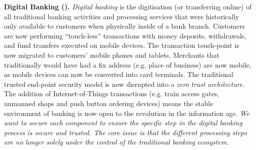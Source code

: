 \begin{Workpackage}{\thewpno}
\begin{Task}

\textbf{Digital Banking (\SOPRAshort{}).} \emph{Digital banking} is the digitisation (or transferring online) of all traditional banking activities and processing services that were historically only available to customers when physically inside of a bank branch. Customers are now performing ``touch-less'' transactions with money deposits, withdrawals, and fund transfers executed on mobile devices. The transaction touch-point is now migrated to customers' mobile phones and tablets. Merchants that traditionally would have had a fix address (e.g. place of business) are now mobile, as  mobile devices can now be converted into card terminals. The traditional trusted end-point security model is now disrupted into a \emph{zero trust architecture}. The addition of Internet-of-Things transactions (e.g. train access gates, unmanned shops and push button ordering devices) means the stable environment of banking is now open to the revolution in the information age. \emph{We want to secure each component to ensure the specific step in the digital banking process is secure and trusted. The core issue is that the different processing steps are no longer solely under the control of the traditional banking ecosystem.}


\end{Task}
\end{Workpackage}
